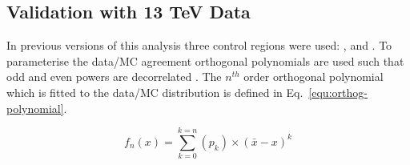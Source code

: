 
\subsection{Validation with 13 TeV Data}
\label{sec:valid13}
In previous versions of this analysis three control regions
were used: \mj, \mmj and \gj. To parameterise the data/MC agreement
orthogonal polynomials are used such that odd and even powers 
are decorrelated \cite{cohen2013applied}. 
The $n^{th}$ order orthogonal polynomial which is fitted to the data/MC 
distribution is defined in Eq.~\ref{equ:orthog-polynomial}.

\begin{equation}
  \label{equ:orthog-polynomial}
  f_n(x) = \sum_{k=0}^{k=n}{(p_k)\times(\bar{x}-x)^k}
\end{equation}

